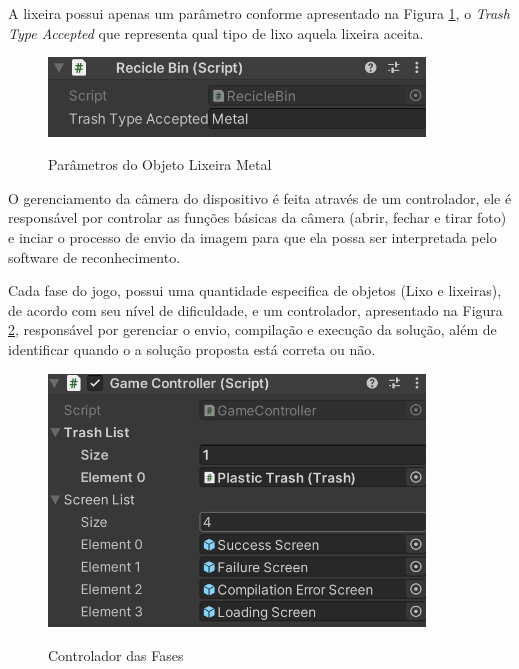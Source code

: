    A lixeira possui apenas um parâmetro conforme apresentado na Figura \ref{figura:parametro_lixeira}, o \textit{Trash Type Accepted} que representa qual tipo de lixo aquela lixeira aceita.
    
    \begin{figure}[H]
        \caption{Parâmetros do Objeto Lixeira Metal}
        \centering
        \includegraphics[width=10cm]{Imagens/Cap4/parametro_lixeira.png}
        \label{figura:parametro_lixeira}
    \end{figure}
    
    O gerenciamento da câmera do dispositivo é feita através de um controlador, ele é responsável por controlar as funções básicas da câmera (abrir, fechar e tirar foto) e inciar o processo de envio da imagem para que ela possa ser interpretada pelo software de reconhecimento.
    
    Cada fase do jogo, possui uma quantidade especifica de objetos (Lixo e lixeiras), de acordo com seu nível de dificuldade, e um controlador, apresentado na Figura \ref{figura:controlador_fases}, responsável por gerenciar o envio, compilação e execução da solução, além de identificar quando o a solução proposta está correta ou não. 
    
    \begin{figure}[H]
        \caption{Controlador das Fases}
        \centering
        \includegraphics[width=10cm]{Imagens/Cap4/controlador_fases.png}
        \label{figura:controlador_fases}
    \end{figure}
    
